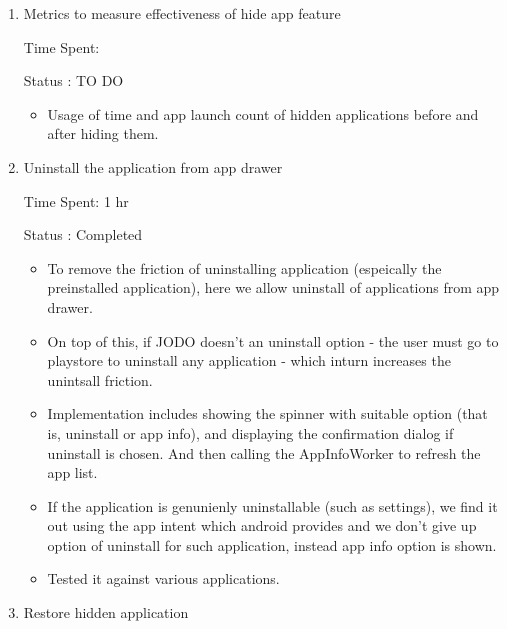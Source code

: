 \documentclass{article}
\begin{document}
\begin{enumerate}
\begin{enumerate}
        \item Added the feature where you can simply hide the application from jodo launcher - that is, it is not displayed when the app list is rendered. So the user can hide it without worrying to uninstall the application.
        \item Allows to hide any application present in the list - pre-installed or not.
        \item If the user wants to use that application - they either needs to open it via the playstore or restore it from hidden apps list. This adds friction in accessing the application. 
        \item Implementation included adding a spinner layout and maintaing a shared pref to contain the list of applications the user chose to hide and then skipping them from the rendering list.
        \item The effectiveness of this feature can be made by comparing the usage stats (usage time and app launch count) of the hidden application before and after hiding the application.
    \end{enumerate}

    \item Metrics to measure effectiveness of hide app feature
    
    Time Spent: 

    Status : TO DO
    \begin{itemize}
        \item Usage of time and app launch count of hidden applications before and after hiding them.
    \end{itemize}

    \item Uninstall the application from app drawer
    
    Time Spent: 1 hr

    Status : Completed
    \begin{itemize}
        \item To remove the friction of uninstalling application (espeically the preinstalled application), here we allow uninstall of applications from app drawer.
        \item On top of this, if JODO doesn't an uninstall option - the user must go to playstore to uninstall any application - which inturn increases the unintsall friction.
        \item Implementation includes showing the spinner with suitable option (that is, uninstall or app info), and displaying the confirmation dialog if uninstall is chosen. And then calling the AppInfoWorker to refresh the app list.
        \item If the application is genunienly uninstallable (such as settings), we find it out using the app intent which android provides and we don't give up option of uninstall for such application, instead app info option is shown.
        \item Tested it against various applications.
    \end{itemize}
    \item Restore hidden application
    

\end{enumerate}
\end{document}
